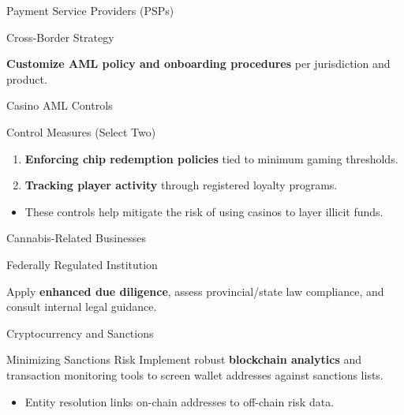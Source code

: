 \documentclass{beamer}
\begin{document}
	\begin{frame}{Payment Service Providers (PSPs)}
		\begin{block}{Cross-Border Strategy}
			\begin{center}
				\textbf{Customize AML policy and onboarding procedures} per jurisdiction and product.
			\end{center}
		\end{block}
	\end{frame}
	
	\begin{frame}{Casino AML Controls}
		\begin{block}{Control Measures (Select Two)}
			\begin{enumerate}
				\item \textbf{Enforcing chip redemption policies} tied to minimum gaming thresholds.
				\item \textbf{Tracking player activity} through registered loyalty programs.
			\end{enumerate}
		\end{block}
		\begin{itemize}
			\item These controls help mitigate the risk of using casinos to layer illicit funds.
		\end{itemize}
	\end{frame}
	
	\begin{frame}{Cannabis-Related Businesses}
		\begin{block}{Federally Regulated Institution}
			\begin{center}
				Apply \textbf{enhanced due diligence}, assess provincial/state law compliance, and consult internal legal guidance.
			\end{center}
		\end{block}
	\end{frame}
	
	\begin{frame}{Cryptocurrency and Sanctions}
		\begin{block}{Minimizing Sanctions Risk}
			Implement robust \textbf{blockchain analytics} and transaction monitoring tools to screen wallet addresses against sanctions lists.
		\end{block}
		\begin{itemize}
			\item Entity resolution links on-chain addresses to off-chain risk data.
		\end{itemize}
	\end{frame}
	
\end{document}
